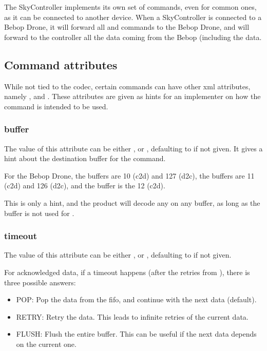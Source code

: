 The SkyController implements its own set of commands, even for common ones, as it can be connected to another device. When a SkyController is connected to a Bebop Drone, it will forward all  and  commands to the Bebop Drone, and will forward to the controller all the data coming from the Bebop (including the  data.

\subsection{Command attributes}

While not tied to the  codec, certain commands can have other xml attributes, namely ,  and . These attributes are given as hints for an implementer on how the command is intended to be used.

\subsubsection{buffer}

The value of this attribute can be either ,  or , defaulting to  if not given. It gives a hint about the destination buffer for the command.

For the Bebop Drone, the  buffers are 10 (c2d) and 127 (d2c), the  buffers are 11 (c2d) and 126 (d2c), and the  buffer is the 12 (c2d).

This is only a hint, and the product will decode any  on any  buffer, as long as the buffer is not used for .

\subsubsection{timeout}

The value of this attribute can be either ,  or , defaulting to  if not given.

For acknowledged data, if a timeout happens (after the retries from ), there is three possible answers:
\begin{itemize}
\item{POP: Pop the data from the fifo, and continue with the next data (default).}
\item{RETRY: Retry the data. This leads to infinite retries of the current data.}
\item{FLUSH: Flush the entire  buffer. This can be useful if the next data depends on the current one.}
\end{itemize}

